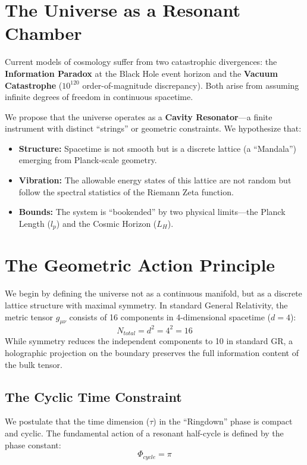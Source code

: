 \documentclass[11pt, letterpaper, openany]{book}
\begin{document}
\section{The Universe as a Resonant Chamber}
Current models of cosmology suffer from two catastrophic divergences: the \textbf{Information Paradox} at the Black Hole event horizon and the \textbf{Vacuum Catastrophe} ($10^{120}$ order-of-magnitude discrepancy). Both arise from assuming infinite degrees of freedom in continuous spacetime.

We propose that the universe operates as a \textbf{Cavity Resonator}---a finite instrument with distinct ``strings'' or geometric constraints. We hypothesize that:
\begin{itemize}
    \item \textbf{Structure:} Spacetime is not smooth but is a discrete lattice (a ``Mandala'') emerging from Planck-scale geometry.
    \item \textbf{Vibration:} The allowable energy states of this lattice are not random but follow the spectral statistics of the Riemann Zeta function.
    \item \textbf{Bounds:} The system is ``bookended'' by two physical limits---the Planck Length ($l_p$) and the Cosmic Horizon ($L_H$).
\end{itemize}

\section{The Geometric Action Principle}
We begin by defining the universe not as a continuous manifold, but as a discrete lattice structure with maximal symmetry. In standard General Relativity, the metric tensor $g_{\mu\nu}$ consists of 16 components in 4-dimensional spacetime ($d=4$):
\begin{equation}
    N_{total} = d^2 = 4^2 = 16
\end{equation}
While symmetry reduces the independent components to 10 in standard GR, a holographic projection on the boundary preserves the full information content of the bulk tensor.

\subsection{The Cyclic Time Constraint}
We postulate that the time dimension ($\tau$) in the ``Ringdown'' phase is compact and cyclic. The fundamental action of a resonant half-cycle is defined by the phase constant:
\begin{equation}
    \Phi_{cycle} = \pi
\end{equation}
\end{document}
